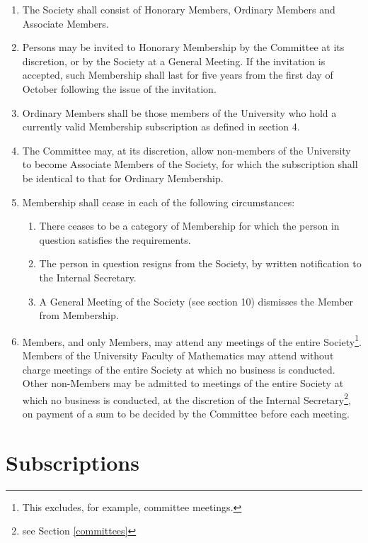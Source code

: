 \documentclass{article}
\begin{document}
\begin{enumerate}
\item The Society shall consist of Honorary Members, Ordinary Members and
Associate Members.
\item Persons may be invited to Honorary Membership by the Committee at
its discretion, or by the Society at a General Meeting. If the invitation is
accepted, such Membership shall last for five years from the first day of
October following the issue of the invitation.
\item Ordinary Members shall be those members of the University who hold a
currently valid Membership subscription as defined in section 4.
\item The Committee may, at its discretion, allow non-members of the University to become Associate Members of the Society, for which the subscription shall be identical to that for Ordinary Membership.
\item Membership shall cease in each of the following circumstances:
  \begin{enumerate}
  \item There ceases to be a category of Membership for which the person in
  question satisfies the requirements.
  \item The person in question resigns from the Society, by written notification to the Internal Secretary.
  \item A General Meeting of the Society (see section 10) dismisses the Member from Membership.
  \end{enumerate}
\item Members, and only Members, may attend any meetings of the entire Society\footnote{This excludes, for example, committee meetings.}. Members of the University Faculty of Mathematics may attend
without charge meetings of the entire Society at which no business is conducted. Other non-Members may be admitted to meetings of the entire
Society at which no business is conducted, at the discretion of the Internal Secretary\footnote{see Section \ref{committees}}, on payment of a sum to be decided by the Committee before each
meeting.
\end{enumerate}


\section{Subscriptions}
\end{document}
